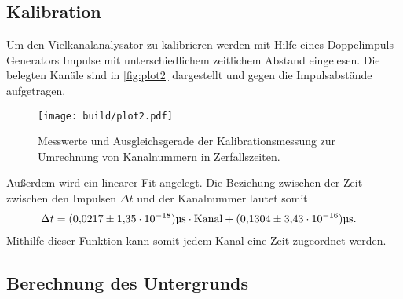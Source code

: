 \subsection{Kalibration}
\label{subsec:Kalibration}
Um den Vielkanalanalysator zu kalibrieren werden mit Hilfe eines Doppelimpuls-Generators Impulse
mit unterschiedlichem zeitlichem Abstand eingelesen. Die belegten Kanäle sind in \autoref{fig:plot2} dargestellt und gegen die Impulsabstände aufgetragen.
\begin{figure}[H]
  \centering
  \texttt{[image: build/plot2.pdf]}
  \caption {Messwerte und Ausgleichsgerade der Kalibrationsmessung zur Umrechnung von Kanalnummern in Zerfallszeiten.}
  \label{fig:plot2}
\end{figure}
Außerdem wird ein linearer Fit angelegt. Die Beziehung zwischen der Zeit zwischen den Impulsen $\Delta t$ und der Kanalnummer lautet somit
\begin{align}
  \Delta t &= (\num{0.0217} \pm \num{1.35 e{-18}}) \si{\micro\second}  \cdot \text{Kanal}+ (\num{0.1304} \pm \num{3.43e-16})\si{\micro\second}.
  \label{eqn:tau}
\end{align}
Mithilfe dieser Funktion kann somit jedem Kanal eine Zeit zugeordnet werden.

\subsection{Berechnung des Untergrunds}
\label{subsec:Untergrund}

